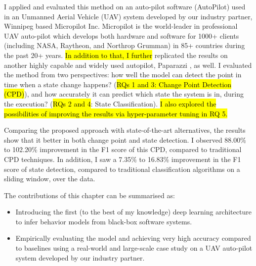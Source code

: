 

I applied and evaluated this method on an auto-pilot software (AutoPilot) used in an Unmanned Aerial Vehicle (UAV) system developed by our industry partner, Winnipeg based Micropilot Inc. Micropilot is the world-leader in professional UAV auto-pilot which develops both hardware and software for 1000+ clients (including NASA, Raytheon, and Northrop Grumman) in 85+ countries during the past 20+ years. \hl{In addition to that, I further} replicated the results on another highly capable and widely used autopilot, Paparazzi \cite{hattenberger2014using}, as well.
I evaluated the method from two perspectives: how well the model can detect the point in time when a state change happens? (\hl{RQs 1 and 3: Change Point Detection (CPD)}), and how accurately it can predict which state the system is in, during the execution? (\hl{RQs 2 and 4}: State Classification). \hl{I also explored the possibilities of improving the results via hyper-parameter tuning in RQ 5.}



Comparing the proposed approach with state-of-the-art alternatives, the results show that it better in both change point and state detection. I observed 88.00\% to 102.20\% improvement in the F1 score of this CPD, compared to traditional CPD techniques. In addition, I saw a 7.35\% to 16.83\% improvement in the F1 score of state detection, compared to traditional classification algorithms on a sliding window, over the data.


The contributions of this chapter can be summarised as:
\begin{itemize}
    \item Introducing the first (to the best of my knowledge) deep learning architecture to infer behavior models from black-box software systems.
    \item Empirically evaluating the model and achieving very high accuracy compared to baselines using a real-world and large-scale case study on a UAV auto-pilot system developed by our industry partner.
\end{itemize}

